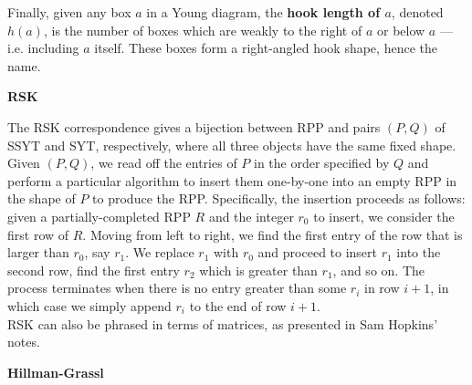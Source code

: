 Finally, given any box $a$ in a Young diagram, the \textbf{hook length of $a$}, denoted $h(a)$, is the number of boxes which are weakly to the right of $a$ or below $a$ --- i.e. including $a$ itself. These boxes form a right-angled hook shape, hence the name.\\



\vspace{.25in}

\Large \textbf{RSK}\\

\normalsize

The RSK correspondence gives a bijection between RPP and pairs $(P, Q)$ of SSYT and SYT, respectively, where all three objects have the same fixed shape. Given $(P, Q)$, we read off the entries of $P$ in the order specified by $Q$ and perform a particular algorithm to insert them one-by-one into an empty RPP in the shape of $P$ to produce the RPP. Specifically, the insertion proceeds as follows: given a partially-completed RPP $R$ and the integer $r_0$ to insert, we consider the first row of $R$. Moving from left to right, we find the first entry of the row that is larger than $r_0$, say $r_1$. We replace $r_1$ with $r_0$ and proceed to insert $r_1$ into the second row, find the first entry $r_2$ which is greater than $r_1$, and so on. The process terminates when there is no entry greater than some $r_i$ in row $i + 1$, in which case we simply append $r_i$ to the end of row $i + 1$.\\

RSK can also be phrased in terms of matrices, as presented in Sam Hopkins' notes.



\vspace{.25in}

\Large \textbf{Hillman-Grassl}\\

\normalsize

